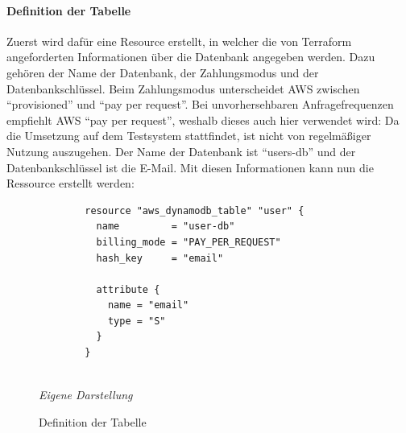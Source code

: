 	\paragraph{Definition der Tabelle}
	Zuerst wird dafür eine Resource erstellt, in welcher die von Terraform angeforderten Informationen über die Datenbank angegeben werden. \newline \cite{TerraformBestPractices2024}\newline Dazu gehören der Name der Datenbank, der Zahlungsmodus und der Datenbankschlüssel. Beim Zahlungsmodus unterscheidet AWS zwischen ``provisioned'' und ``pay per request''. Bei unvorhersehbaren Anfragefrequenzen empfiehlt AWS ``pay per request'', weshalb dieses auch hier verwendet wird: Da die Umsetzung auf  dem Testsystem stattfindet, ist nicht von regelmäßiger Nutzung auszugehen. Der Name der Datenbank ist ``users-db'' und der Datenbankschlüssel ist die E-Mail. Mit diesen Informationen kann nun die Ressource erstellt werden:
	
		\begin{figure}[H]
		\centering
		\begin{minipage}[t]{.7\textwidth} %
		\caption{Definition der Tabelle} %
		\begin{verbatim}
		resource "aws_dynamodb_table" "user" {
		  name         = "user-db"
		  billing_mode = "PAY_PER_REQUEST"
		  hash_key     = "email"
		
		  attribute {
		    name = "email"
		    type = "S"
		  }
		}
		
		\end{verbatim}
		
		\textit{Eigene Darstellung} %
		\label{fig:tabellenDefinition}
		\end{minipage}
		\end{figure}
